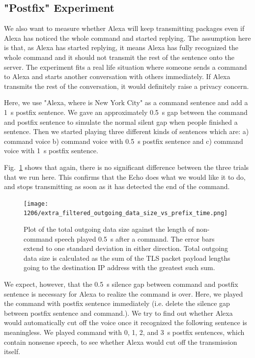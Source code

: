 \subsection{"Postfix" Experiment}
  
We also want to measure whether Alexa will keep transmitting packages even if Alexa has noticed the whole command and started replying. The assumption here is that, as Alexa has started replying, it means Alexa has fully recognized the whole command and it should not transmit the rest of the sentence onto the server. The experiment fits a real life situation where someone sends a command to Alexa and starts another conversation with others immediately. If Alexa transmits the rest of the conversation, it would definitely raise a privacy concern.

Here, we use "Alexa, where is New York City" as a command sentence and add a 1~s postfix sentence. We gave an approximately 0.5~s gap between the command and postfix sentence to simulate the normal silent gap when people finished a sentence. Then we started playing three different kinds of sentences which are: a) command voice b) command voice with 0.5~s postfix sentence and c) command voice with 1~s postfix sentence.

Fig.~\ref{fig:postfix_gap} shows that again, there is no significant difference between the three trials that we run here. This confirms that the Echo does what we would like it to do, and stops transmitting as soon as it has detected the end of the command.

\begin{figure}[!t]
    \centering
    \texttt{[image: 1206/extra\_filtered\_outgoing\_data\_size\_vs\_prefix\_time.png]}
    \caption{Plot of the total outgoing data size against the length of non-command speech played 0.5~s after a command. The error bars extend to one standard deviation in either direction. Total outgoing data size is calculated as the sum of the TLS packet payload lengths going to the destination IP address with the greatest such sum.}
    \label{fig:postfix_gap}
\end{figure}



We expect, however, that the 0.5~s silence gap between command and postfix sentence is necessary for Alexa to realize the command is over. Here, we played the command with postfix sentence immediately (i.e. delete the silence gap between postfix sentence and command.). We try to find out whether Alexa would automatically cut off the voice once it recognized the following sentence is meaningless. We played command with 0, 1, 2, and 3~s postfix sentences, which contain nonsense speech, to see whether Alexa would cut off the transmission itself.

